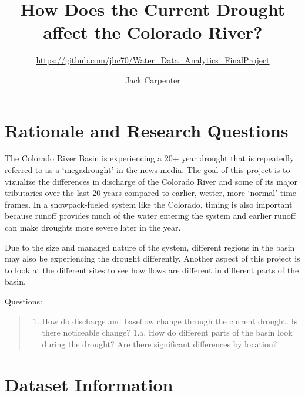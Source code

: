 \documentclass[
  12pt,
]{article}
\title{How Does the Current Drought affect the Colorado River?}
\subtitle{\url{https://github.com/jbc70/Water_Data_Analytics_FinalProject}}
\author{Jack Carpenter}
\date{}
\providecommand{\tightlist}{%
  \setlength{\itemsep}{0pt}\setlength{\parskip}{0pt}}
\begin{document}
\maketitle

\newpage

\hypertarget{rationale-and-research-questions}{%
\section{Rationale and Research
Questions}\label{rationale-and-research-questions}}

The Colorado River Basin is experiencing a 20+ year drought that is
repeatedly referred to as a `megadrought' in the news media. The goal of
this project is to vizualize the differences in discharge of the
Colorado River and some of its major tributaries over the last 20 years
compared to earlier, wetter, more `normal' time frames. In a
snowpack-fueled system like the Colorado, timing is also important
because runoff provides much of the water entering the system and
earlier runoff can make droughts more severe later in the year.

Due to the size and managed nature of the system, different regions in
the basin may also be experiencing the drought differently. Another
aspect of this project is to look at the different sites to see how
flows are different in different parts of the basin.

Questions:

\begin{quote}
\begin{enumerate}
\def\labelenumi{\arabic{enumi}.}
\tightlist
\item
  How do discharge and baseflow change through the current drought. Is
  there noticeable change? 1.a. How do different parts of the basin look
  during the drought? Are there significant differences by location?
\end{enumerate}
\end{quote}

\newpage

\hypertarget{dataset-information}{%
\section{Dataset Information}\label{dataset-information}}
\end{document}

